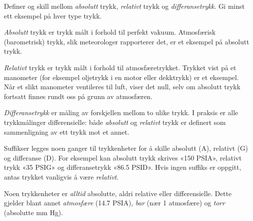 
Definer og skill mellom {\it absolutt} trykk, {\it relativt} trykk og {\it differansetrykk}. Gi minst ett eksempel på hver type trykk.







{\it Absolutt} trykk er trykk målt i forhold til perfekt vakuum. Atmosfærisk (barometrisk) trykk, slik meteorologer rapporterer det, er et eksempel på absolutt trykk.

{\it Relativt} trykk er trykk målt i forhold til atmosfæretrykket. Trykket vist på et manometer (for eksempel oljetrykk i en motor eller dekktrykk) er et eksempel. Når et slikt manometer ventileres til luft, viser det null, selv om absolutt trykk fortsatt finnes rundt oss på grunn av atmosfæren.

{\it Differansetrykk} er måling av forskjellen mellom to ulike trykk. I praksis er alle trykkmålinger differensielle: både {\it absolutt} og {\it relativt} trykk er definert som sammenligning av ett trykk mot et annet.

Suffikser legges noen ganger til trykkenheter for å skille absolutt (A), relativt (G) og differanse (D). For eksempel kan absolutt trykk skrives «150 PSIA», relativt trykk «35 PSIG» og differansetrykk «86.5 PSID». Hvis ingen suffiks er oppgitt, antas trykket vanligvis å være {\it relativt}.

Noen trykkenheter er {\it alltid} absolutte, aldri relative eller differensielle. Dette gjelder blant annet {\it atmosfære} (14.7 PSIA), {\it bar} (nær 1 atmosfære) og {\it torr} (absolutte mm Hg).










